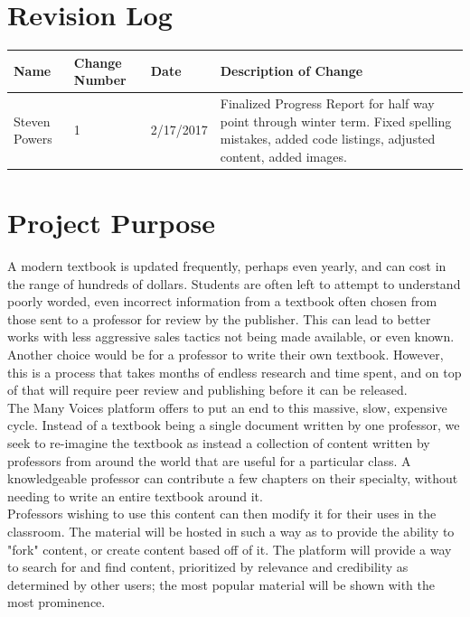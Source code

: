\documentclass[onecolumn, draftclsnofoot,10pt, compsoc]{IEEEtran}
\begin{document}
\section{Revision Log}

\tablehead{}
\begin{supertabular}{|p{3cm}|p{3cm}|p{3cm}|p{7cm}|}
\hline
Name & Change Number & Date & Description of Change
\\\hline
Steven Powers & 1 & 2/17/2017 & Finalized Progress Report for half way point through
		winter term. Fixed spelling mistakes, added code listings, adjusted content, added images.
\\\hline
\end{supertabular}


\section{Project Purpose}
\noindent A modern textbook is updated frequently, perhaps even yearly,
and can cost in the range of hundreds of dollars. Students are often left
to attempt to understand poorly worded, even incorrect information from a textbook
often chosen from those sent to a professor for review by the publisher.
This can lead to better works with less aggressive sales tactics not being
made available, or even known.
Another choice would be for a professor to write their own textbook.
However, this is a process that takes months of endless research and
time spent, and on top of that will require peer review and publishing
before it can be released. \\

\noindent The Many Voices platform offers to put an end to this massive,
slow, expensive cycle.  Instead of a textbook being a single document
written by one professor, we seek to re-imagine the textbook as instead
a collection of content written by professors from around the world
that are useful for a particular class. A knowledgeable professor can
contribute a few chapters on their specialty, without needing to write
an entire textbook around it. \\

\noindent Professors wishing to use this content can then modify it for
their uses in the classroom. The material will be hosted in such a way
as to provide the ability to "fork" content, or create content based
off of it. The platform will provide a way to search for and find content,
prioritized by relevance and credibility as determined by other users;
the most popular material will be shown with the most prominence.
\end{document}
